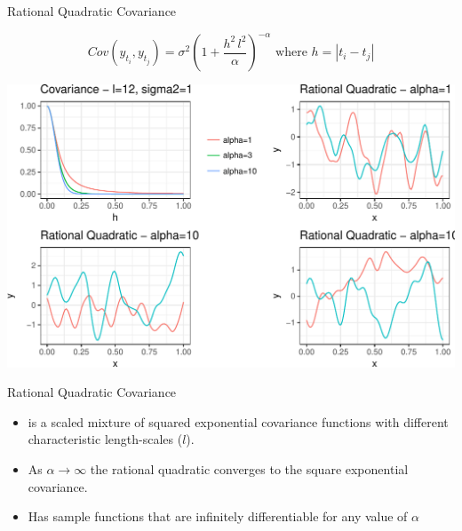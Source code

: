 \documentclass[11pt,ignorenonframetext,]{beamer}
\providecommand{\tightlist}{%
  \setlength{\itemsep}{0pt}\setlength{\parskip}{0pt}}
\begin{document}
\begin{frame}[t]{%
\protect\hypertarget{rational-quadratic-covariance}{%
Rational Quadratic Covariance}}

\vspace{-5mm}

\[ Cov(y_{t_i}, y_{t_j}) = \sigma^2 \left(1 + \frac{h^2 \, l^2}{\alpha}\right)^{-\alpha} \text{   where } h = |t_i - t_j|\]

\begin{center}\includegraphics[width=\textwidth]{Lec14_files/figure-beamer/unnamed-chunk-4-1} \end{center}

\end{frame}

\begin{frame}[t]{%
\protect\hypertarget{rational-quadratic-covariance-1}{%
Rational Quadratic Covariance}}

\begin{itemize}
\tightlist
\item
  is a scaled mixture of squared exponential covariance functions with
  different characteristic length-scales (\(l\)).
\end{itemize}

\vspace{1mm}

\begin{itemize}
\tightlist
\item
  As \(\alpha \to \infty\) the rational quadratic converges to the
  square exponential covariance.
\end{itemize}

\vspace{1mm}

\begin{itemize}
\tightlist
\item
  Has sample functions that are infinitely differentiable for any value
  of \(\alpha\)
\end{itemize}

\end{frame}
\end{document}
